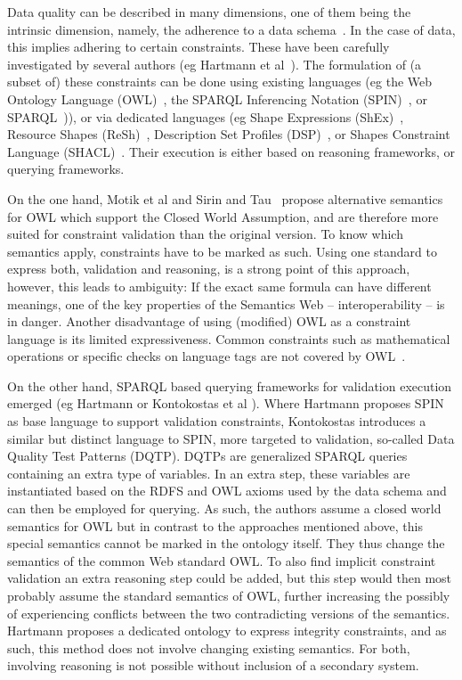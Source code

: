 Data quality can be described in many dimensions,
one of them being the intrinsic dimension, namely,
the adherence to a data schema~\cite{zaveri2015quality}.
In the case of \rdf data, this implies adhering to certain constraints.
These have been carefully investigated by several authors (eg Hartmann et al~\cite{hartmann2016}).
The formulation of (a subset of) these constraints can be done using existing languages (eg the Web Ontology Language (OWL)~\cite{owl}, 
the SPARQL Inferencing Notation (SPIN)~\cite{Knublauch2011}, or SPARQL~\cite{sparql})),
or via dedicated languages
(eg Shape Expressions (ShEx)~\cite{shex}, Resource Shapes (ReSh)~\cite{resh}, Description Set Profiles (DSP)~\cite{dsp}, 
or Shapes Constraint Language (SHACL)~\cite{shacl}.
Their execution is either based on reasoning frameworks, or querying frameworks.

On the one hand, Motik et al \cite{motik2007adding} and Sirin and Tau~\cite{sirin2009towards}
propose alternative semantics for OWL
which support the Closed World Assumption,
and are therefore more suited for constraint validation than the original version.
To know which semantics apply,
constraints have to be marked as such.
Using one standard to express both, validation and reasoning,
is a strong point of this approach,
however,  this leads to ambiguity: %
%
If the exact same formula can have different meanings, one of the key properties of the Semantics Web -- interoperability -- is in danger.
Another disadvantage of using (modified) OWL as a constraint language
is its limited expressiveness. 
Common constraints such as mathematical operations
or specific checks on language tags
are not covered by OWL~\cite{hartmann2016}.

On the other hand, SPARQL based querying frameworks for validation execution emerged (eg Hartmann \cite{hartmann2016} or Kontokostas et al \cite{kontokostas2014test}).
Where Hartmann proposes SPIN as base language to support validation constraints, Kontokostas introduces a similar but distinct language to SPIN,
more targeted to validation, so-called Data Quality Test Patterns (DQTP). 
DQTPs are generalized  SPARQL queries containing an extra type of variables. In an extra step, these variables are instantiated based on the  RDFS and OWL axioms used
by the data schema and can then be employed for querying. 
As such, the authors assume a closed world semantics for OWL
but in contrast to the approaches mentioned above,
this special semantics cannot be marked in the ontology itself.
They thus change the semantics of the common Web standard OWL.
To also find implicit constraint validation an extra reasoning step could be added,
but this step would then most probably assume the standard semantics of OWL,
further increasing the possibly of experiencing conflicts between the two contradicting versions of the semantics.
Hartmann proposes a dedicated ontology
to express integrity constraints, and as such,
this method does not involve changing existing semantics.
For both, involving reasoning is not possible without inclusion of a secondary system.



